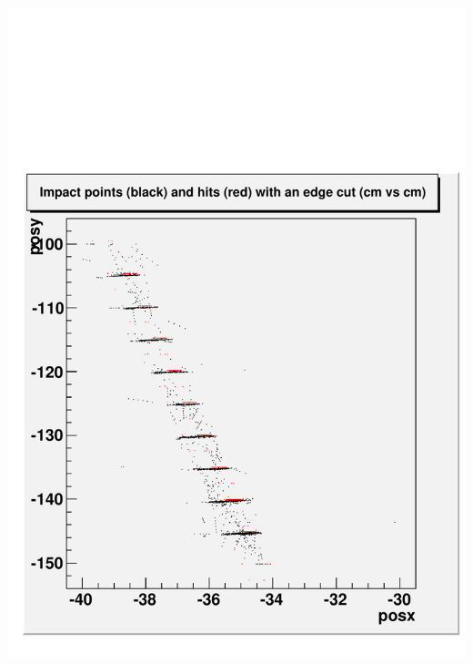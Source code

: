 \documentclass[compress]{beamer}
\begin{document}
\begin{frame}
\begin{columns}
\includegraphics[width=\linewidth]{selectioneffect_withcut.pdf}
\end{columns}
\end{frame}
\end{document}
